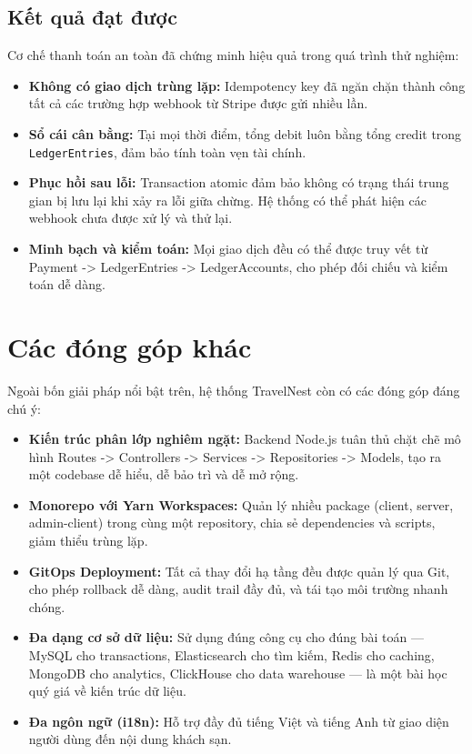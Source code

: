 \documentclass[13pt,a4paper,twoside]{report}
\begin{document}
\subsection{Kết quả đạt được}

Cơ chế thanh toán an toàn đã chứng minh hiệu quả trong quá trình thử nghiệm:

\begin{itemize}
  \item \textbf{Không có giao dịch trùng lặp:} Idempotency key đã ngăn chặn thành công tất cả các trường hợp webhook từ Stripe được gửi nhiều lần.
  \item \textbf{Sổ cái cân bằng:} Tại mọi thời điểm, tổng debit luôn bằng tổng credit trong \texttt{LedgerEntries}, đảm bảo tính toàn vẹn tài chính.
  \item \textbf{Phục hồi sau lỗi:} Transaction atomic đảm bảo không có trạng thái trung gian bị lưu lại khi xảy ra lỗi giữa chừng. Hệ thống có thể phát hiện các webhook chưa được xử lý và thử lại.
  \item \textbf{Minh bạch và kiểm toán:} Mọi giao dịch đều có thể được truy vết từ Payment -> LedgerEntries -> LedgerAccounts, cho phép đối chiếu và kiểm toán dễ dàng.
\end{itemize}

\section{Các đóng góp khác}

Ngoài bốn giải pháp nổi bật trên, hệ thống TravelNest còn có các đóng góp đáng chú ý:

\begin{itemize}
  \item \textbf{Kiến trúc phân lớp nghiêm ngặt:} Backend Node.js tuân thủ chặt chẽ mô hình Routes -> Controllers -> Services -> Repositories -> Models, tạo ra một codebase dễ hiểu, dễ bảo trì và dễ mở rộng.
  \item \textbf{Monorepo với Yarn Workspaces:} Quản lý nhiều package (client, server, admin-client) trong cùng một repository, chia sẻ dependencies và scripts, giảm thiểu trùng lặp.
  \item \textbf{GitOps Deployment:} Tất cả thay đổi hạ tầng đều được quản lý qua Git, cho phép rollback dễ dàng, audit trail đầy đủ, và tái tạo môi trường nhanh chóng.
  \item \textbf{Đa dạng cơ sở dữ liệu:} Sử dụng đúng công cụ cho đúng bài toán --- MySQL cho transactions, Elasticsearch cho tìm kiếm, Redis cho caching, MongoDB cho analytics, ClickHouse cho data warehouse --- là một bài học quý giá về kiến trúc dữ liệu.
  \item \textbf{Đa ngôn ngữ (i18n):} Hỗ trợ đầy đủ tiếng Việt và tiếng Anh từ giao diện người dùng đến nội dung khách sạn.
\end{itemize}
\end{document}
